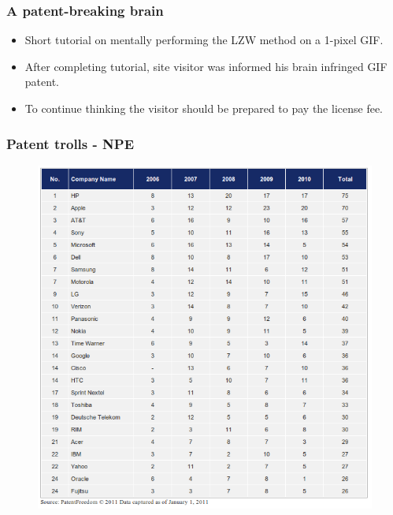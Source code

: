 \begin{frame}
\frametitle{A patent-breaking brain}

\begin{itemize}
\item Short tutorial on mentally performing the LZW method on a 1-pixel GIF.
\item After completing tutorial, site visitor was informed his brain infringed GIF patent.
\item To continue thinking the visitor should be prepared to pay the license fee.
\end{itemize}                                                 

\end{frame}



\begin{frame}
\frametitle{Patent trolls - NPE}

\begin{figure}
 \vspace{-0.3cm}
\begin{center}
	\includegraphics[scale=0.35,clip=true]{figs/patent-trolls.png}
\end{center}
\end{figure}

\end{frame}


